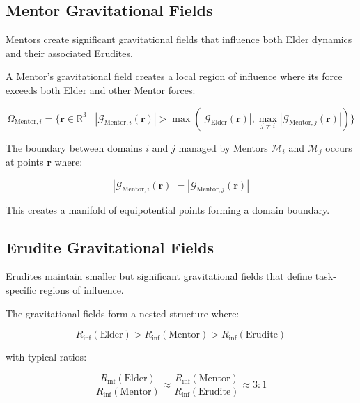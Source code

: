 \subsection{Mentor Gravitational Fields}

Mentors create significant gravitational fields that influence both Elder dynamics and their associated Erudites.

\begin{theorem}
A Mentor's gravitational field creates a local region of influence where its force exceeds both Elder and other Mentor forces:

\begin{equation}
\Omega_{\text{Mentor},i} = \{\mathbf{r} \in \mathbb{R}^3 \mid |\mathcal{G}_{\text{Mentor},i}(\mathbf{r})| > \max(|\mathcal{G}_{\text{Elder}}(\mathbf{r})|, \max_{j \neq i}|\mathcal{G}_{\text{Mentor},j}(\mathbf{r})|)\}
\end{equation}
\end{theorem}

\begin{definition}
The boundary between domains $i$ and $j$ managed by Mentors $\mathcal{M}_i$ and $\mathcal{M}_j$ occurs at points $\mathbf{r}$ where:

\begin{equation}
|\mathcal{G}_{\text{Mentor},i}(\mathbf{r})| = |\mathcal{G}_{\text{Mentor},j}(\mathbf{r})|
\end{equation}

This creates a manifold of equipotential points forming a domain boundary.
\end{definition}

\subsection{Erudite Gravitational Fields}

Erudites maintain smaller but significant gravitational fields that define task-specific regions of influence.

\begin{proposition}
The gravitational fields form a nested structure where:

\begin{equation}
R_{\text{inf}}(\text{Elder}) > R_{\text{inf}}(\text{Mentor}) > R_{\text{inf}}(\text{Erudite})
\end{equation}

with typical ratios:

\begin{equation}
\frac{R_{\text{inf}}(\text{Elder})}{R_{\text{inf}}(\text{Mentor})} \approx \frac{R_{\text{inf}}(\text{Mentor})}{R_{\text{inf}}(\text{Erudite})} \approx 3:1
\end{equation}
\end{proposition}

